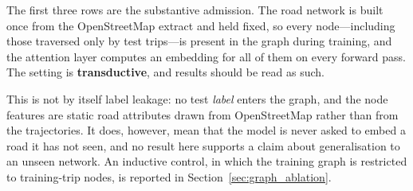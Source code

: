 \documentclass[journal]{IEEEtran}
\begin{document}
\begin{table}[!htbp]
  \centering
  \caption{Provenance of every input. \emph{Test access} asks whether the item is computed from, or influenced by, data in the test partition.}
  \label{tab:provenance}
  \renewcommand{\arraystretch}{1.2}
\end{table}

The first three rows are the substantive admission. The road network is built once from the OpenStreetMap extract and held fixed, so every node---including those traversed only by test trips---is present in the graph during training, and the attention layer computes an embedding for all of them on every forward pass. The setting is \textbf{transductive}, and results should be read as such.

This is not by itself label leakage: no test \emph{label} enters the graph, and the node features are static road attributes drawn from OpenStreetMap rather than from the trajectories. It does, however, mean that the model is never asked to embed a road it has not seen, and no result here supports a claim about generalisation to an unseen network. An inductive control, in which the training graph is restricted to training-trip nodes, is reported in Section~\ref{sec:graph_ablation}.
\end{document}
